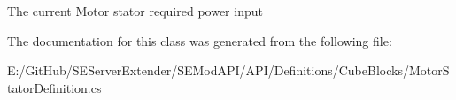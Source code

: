 The current Motor stator required power input 



The documentation for this class was generated from the following file\+:\begin{DoxyCompactItemize}
\item 
E\+:/\+Git\+Hub/\+S\+E\+Server\+Extender/\+S\+E\+Mod\+A\+P\+I/\+A\+P\+I/\+Definitions/\+Cube\+Blocks/Motor\+Stator\+Definition.\+cs\end{DoxyCompactItemize}
